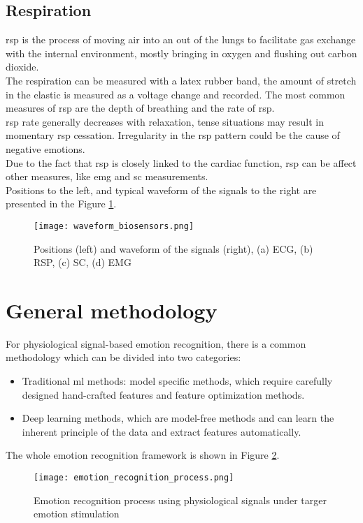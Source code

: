 \subsection{Respiration}
\gls{rsp} is the process of moving air into an out of the lungs to facilitate gas exchange with the internal environment, mostly bringing in oxygen and flushing out carbon dioxide.
\\
The respiration can be measured with a latex rubber band, the amount of stretch in the elastic is measured as a voltage change and recorded. The most common measures of \gls{rsp} are the depth of breathing and the rate of \gls{rsp}.
\\ \indent
\gls{rsp} rate generally decreases with relaxation, tense situations may result in momentary \gls{rsp} cessation. Irregularity in the \gls{rsp} pattern could be the cause of negative emotions.
\\
Due to the fact that \gls{rsp} is closely linked to the cardiac function, \gls{rsp} can be affect other measures, like \gls{emg} and \gls{sc} measurements.
\\
Positions to the left, and typical waveform of the signals to the right are presented in the Figure \ref{fig:waveform_biosensors}.
\begin{figure}[h]
    \centering
    \texttt{[image: waveform\_biosensors.png]} 
	\caption{Positions (left) and waveform of the signals (right), (a) ECG, (b) RSP, (c) SC, (d) EMG}
    \label{fig:waveform_biosensors}
\end{figure}

\section{General methodology}\label{general_methodology}
For physiological signal-based emotion recognition, there is a common methodology which can be divided into two categories:
\begin{itemize}
	\item Traditional \gls{ml} methods: model specific methods, which require carefully designed hand-crafted features and feature optimization methods.
	\item Deep learning methods, which are model-free methods and can learn the inherent principle of the data and extract features automatically.
\end{itemize}
The whole emotion recognition framework is shown in Figure \ref{fig:emotion_recognition_process}.
\begin{figure}[h]
    \centering
    \texttt{[image: emotion\_recognition\_process.png]} 
	\caption{Emotion recognition process using physiological signals under targer emotion stimulation}
    \label{fig:emotion_recognition_process}
\end{figure}

